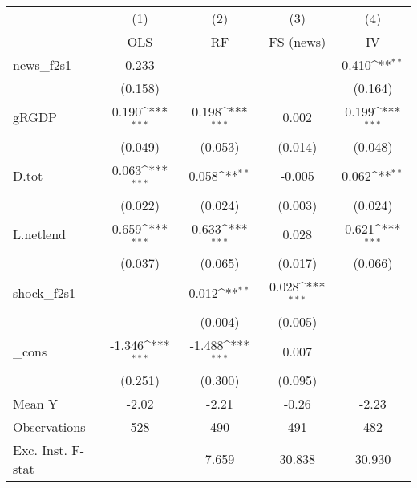{
\def\sym#1{\ifmmode^{#1}\else\(^{#1}\)\fi}
\begin{tabular}{l*{4}{c}}
\toprule
            &\multicolumn{1}{c}{(1)}&\multicolumn{1}{c}{(2)}&\multicolumn{1}{c}{(3)}&\multicolumn{1}{c}{(4)}\\
            &\multicolumn{1}{c}{OLS}&\multicolumn{1}{c}{RF}&\multicolumn{1}{c}{FS (news)}&\multicolumn{1}{c}{IV}\\
\midrule
news\_f2s1   &       0.233         &                     &                     &       0.410\sym{**} \\
            &     (0.158)         &                     &                     &     (0.164)         \\
\addlinespace
gRGDP       &       0.190\sym{***}&       0.198\sym{***}&       0.002         &       0.199\sym{***}\\
            &     (0.049)         &     (0.053)         &     (0.014)         &     (0.048)         \\
\addlinespace
D.tot       &       0.063\sym{***}&       0.058\sym{**} &      -0.005         &       0.062\sym{**} \\
            &     (0.022)         &     (0.024)         &     (0.003)         &     (0.024)         \\
\addlinespace
L.netlend   &       0.659\sym{***}&       0.633\sym{***}&       0.028         &       0.621\sym{***}\\
            &     (0.037)         &     (0.065)         &     (0.017)         &     (0.066)         \\
\addlinespace
shock\_f2s1  &                     &       0.012\sym{**} &       0.028\sym{***}&                     \\
            &                     &     (0.004)         &     (0.005)         &                     \\
\addlinespace
\_cons      &      -1.346\sym{***}&      -1.488\sym{***}&       0.007         &                     \\
            &     (0.251)         &     (0.300)         &     (0.095)         &                     \\
\midrule
Mean Y      &       -2.02         &       -2.21         &       -0.26         &       -2.23         \\
Observations&         528         &         490         &         491         &         482         \\
Exc. Inst. F-stat&                     &       7.659         &      30.838         &      30.930         \\
\bottomrule
\end{tabular}
}
